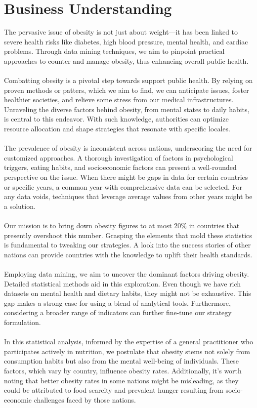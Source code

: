 \part{Business Understanding}

    The pervasive issue of obesity is not just about weight—it has been linked to severe health risks like diabetes,
    high blood pressure, mental health, and cardiac problems. Through data mining techniques, we aim to pinpoint
    practical approaches to counter and manage obesity, thus enhancing overall public health.
    \\
    \\
    Combatting obesity is a pivotal step towards support public health. By relying on proven methods or patters,
    which we aim to find, we can anticipate issues, foster healthier societies, and relieve some stress from our
    medical infrastructures. Unraveling the diverse factors behind obesity, from mental states to daily habits, is
    central to this endeavor. With such knowledge, authorities can optimize resource allocation and shape strategies
    that resonate with specific locales.
    \\
    \\
    The prevalence of obesity is inconsistent across nations, underscoring the need for customized approaches. A
    thorough investigation of factors in psychological triggers, eating habits, and socioeconomic factors can present
    a well-rounded perspective on the issue. When there might be gaps in data for certain countries or specific years,
    a common year with comprehensive data can be selected. For any data voids, techniques that leverage average values
    from other years might be a solution.
    \\
    \\
    Our mission is to bring down obesity figures to at most 20\% in countries that presently overshoot this number.
    Grasping the elements that mold these statistics is fundamental to tweaking our strategies. A look into the success
    stories of other nations can provide countries with the knowledge to uplift their health standards.
    \\
    \\
    Employing data mining, we aim to uncover the dominant factors driving obesity. Detailed statistical methods aid
    in this exploration. Even though we have rich datasets on mental health and dietary habits, they might not be
    exhaustive. This gap makes a strong case for using a blend of analytical tools. Furthermore, considering a broader
    range of indicators can further fine-tune our strategy formulation.
    \\
    \\
    In this statistical analysis, informed by the expertise of a general practitioner who participates actively in
    nutrition, we postulate that obesity stems not solely from consumption habits but also from the mental well-being
    of individuals. These factors, which vary by country, influence obesity rates. Additionally, it’s worth noting that
    better obesity rates in some nations might be misleading, as they could be attributed to food scarcity and prevalent
    hunger resulting from socio-economic challenges faced by those nations.


